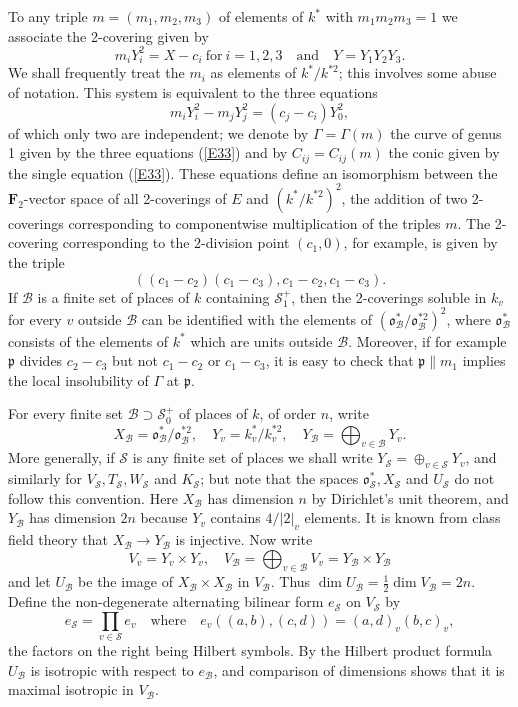 \documentclass[12pt]{article}
\def\bF{{\mathbf F}}
\def\fo{{\mathfrak o}}
\def\fp{{\mathfrak p}}
\def\gG{{\Gamma}}
\def\sB{{\mathcal B}}
\def\sS{{\mathcal S}}
\def\beq{\begin{equation} \label}
\def\half{{\textstyle{\frac{1}{2}}}}
\begin{document}
To any triple $m=(m_1,m_2,m_3)$ of elements of $k^*$ with $m_1m_2m_3=1$ we
associate the 2-covering given by
\beq{E49} m_iY_i^2=X-c_i {\mathrm{~for~}} i=1,2,3 \quad {\mathrm{and}}
\quad Y=Y_1Y_2Y_3. \end{equation}
We shall frequently treat the $m_i$ as elements of $k^*/k^{*2}$; this involves
some abuse of notation. This system is equivalent to the three equations
\beq{E33} m_iY_i^2-m_jY_j^2=(c_j-c_i)Y_0^2, \end{equation}
of which only two are independent;
we denote by $\gG=\gG(m)$ the curve of genus 1 given by the three
equations (\ref{E33}) and by $C_{ij}=C_{ij}(m)$ the conic given by the single
equation (\ref{E33}).
These equations define an isomorphism between the $\bF_2$-vector space
of all 2-coverings of
$E$ and $(k^*/k^{*2})^2$, the addition of two 2-coverings corresponding to
componentwise multiplication of the triples $m$. 
The 2-covering corresponding to the 2-division point
$(c_1,0)$, for example, is given by the triple
\beq{E80} ((c_1-c_2)(c_1-c_3),c_1-c_2,c_1-c_3). \end{equation}
If $\sB$ is a finite set of places of $k$ containing
$\sS_1^+$, then the 2-coverings soluble in $k_v$ for every $v$ outside $\sB$
can be identified with the elements of $(\fo^*_\sB/\fo_\sB^{*2})^2$, where
$\fo_\sB^*$ consists of the elements of $k^*$ which are units outside $\sB$.
Moreover, if for example $\fp$ divides $c_2-c_3$ but not
$c_1-c_2$ or $c_1-c_3$, it is easy to check that $\fp\|m_1$
implies the local insolubility of $\gG$ at $\fp$.

For every finite set $\sB\supset\sS_0^+$ of places of $k$, of order $n$, write
\[ X_\sB=\fo^*_\sB/\fo_\sB^{*2}, \quad Y_v=k_v^*/k_v^{*2}, \quad
Y_\sB={\bigoplus}_{v\in\sB}Y_v. \]
More generally, if $\sS$ is any finite set of places we shall write
$Y_\sS=\oplus_{v\in\sS}Y_v$, and similarly for $V_\sS, T_\sS, W_\sS$ and
$K_\sS$; but note that the spaces $\fo^*_\sS, X_\sS$ and $U_\sS$ do not follow
this convention.
Here $X_\sB$ has dimension $n$ by Dirichlet's unit theorem, and $Y_\sB$ has
dimension $2n$ because $Y_v$ contains $4/|2|_v$ elements.
It is known from class field theory that $X_\sB\rightarrow
Y_\sB$ is injective. Now write
\[ V_v=Y_v\times Y_v, \quad V_\sB={\bigoplus}_{v\in\sB}V_v=Y_\sB\times Y_\sB \]
and let $U_\sB$ be the image of $X_\sB\times X_\sB$ in $V_\sB$. Thus
$\dim U_\sB=\half\dim V_\sB=2n$. Define the non-degenerate
alternating bilinear form $e_\sS$ on $V_\sS$ by
\beq{E50} e_\sS={\prod}_{v\in\sS}e_v \quad {\mathrm{where}} \quad
e_v((a,b),(c,d))=(a,d)_v(b,c)_v, \end{equation}
the factors on the right being Hilbert symbols. By the Hilbert
product formula
$U_\sB$ is isotropic with respect to $e_\sB$, and
comparison of dimensions shows that it is maximal isotropic
in $V_{\sB}$.
\end{document}
